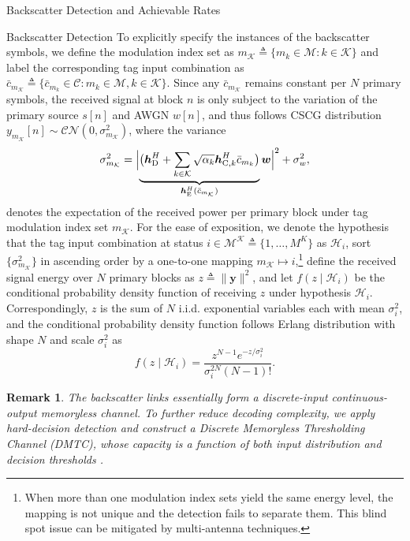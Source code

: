 \documentclass[journal]{IEEEtran}
\newtheorem{remark}{Remark}
\begin{document}
\begin{section}{Backscatter Detection and Achievable Rates}
\begin{subsection}{Backscatter Detection}
			To explicitly specify the instances of the backscatter symbols, we define the modulation index set as $m_{\mathcal{K}} \triangleq \{m_k \in \mathcal{M} : k \in \mathcal{K}\}$ and label the corresponding tag input combination as $\bar{c}_{m_{\mathcal{K}}} \triangleq \{\bar{c}_{m_k} \in \mathcal{C} : m_k \in \mathcal{M}, k \in \mathcal{K}\}$. Since any $\bar{c}_{m_{\mathcal{K}}}$ remains constant per $N$ primary symbols, the received signal at block $n$ is only subject to the variation of the primary source $s[n]$ and AWGN $w[n]$, and thus follows CSCG distribution $y_{m_{\mathcal{K}}}[n] \sim \mathcal{CN}\left(0,\sigma_{m_{\mathcal{K}}}^2\right)$, where the variance
			\begin{equation}
				\sigma_{m_{\mathcal{K}}}^2 = \Bigl\lvert \underbrace{\bigl(\boldsymbol{h}_{\mathrm{D}}^H + \sum_{k \in \mathcal{K}} \sqrt{\alpha_k} \boldsymbol{h}_{\mathrm{C},k}^H \bar{c}_{m_k}\bigr)}_{\boldsymbol{h}_{\mathrm{E}}^H(\bar{c}_{m_{\mathcal{K}}})} \boldsymbol{w} \Bigr\rvert^2 + \sigma_w^2,
				\label{eq:receive_variance}
			\end{equation}
			denotes the expectation of the received power per primary block under tag modulation index set $m_{\mathcal{K}}$. For the ease of exposition, we denote the hypothesis that the tag input combination at status $i \in \mathcal{M^K} \triangleq \{1,\ldots,M^K\}$ as $\mathcal{H}_i$, sort $\{\sigma_{m_{\mathcal{K}}}^2\}$ in ascending order by a one-to-one mapping $m_{\mathcal{K}} \mapsto i$,\footnote{When more than one modulation index sets yield the same energy level, the mapping is not unique and the detection fails to separate them. This blind spot issue can be mitigated by multi-antenna techniques.} define the received signal energy over $N$ primary blocks as $z \triangleq \lVert \boldsymbol{y} \rVert^2$, and let $f(z \mid \mathcal{H}_i)$ be the conditional probability density function of receiving $z$ under hypothesis $\mathcal{H}_i$. Correspondingly, $z$ is the sum of $N$ i.i.d. exponential variables each with mean $\sigma_i^2$, and the conditional probability density function follows Erlang distribution with shape $N$ and scale $\sigma_i^2$ as
			\begin{equation}
				f(z \mid \mathcal{H}_i) = \frac{z^{N-1} e^{-z/\sigma_i^2}}{\sigma_i^{2N} (N-1)!}.
				\label{eq:energy_distribution}
			\end{equation}

			\begin{remark}
				The backscatter links essentially form a discrete-input continuous-output memoryless channel. To further reduce decoding complexity, we apply hard-decision detection and construct a Discrete Memoryless Thresholding Channel (DMTC), whose capacity is a function of both input distribution and decision thresholds \cite{Nguyen2018}.
			\end{remark}


\end{subsection}
\end{section}
\end{document}
